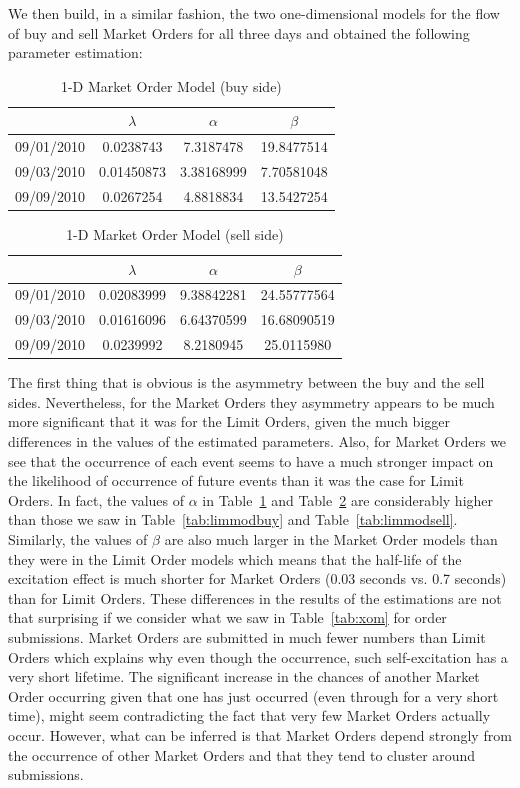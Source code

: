 We then build, in a similar fashion, the two one-dimensional models for the flow of buy and sell Market Orders for all three days and obtained the following parameter estimation: 
	\begin{table}[!ht]
	\centering
	\caption{1-D Market Order Model (buy side) \label{tab:marketorderbuy}}
	\begin{tabular}{c|ccc} 
		& $\lambda$ & $\alpha$ & $\beta$ \\ \hline
	09/01/2010 & 0.0238743 & 7.3187478 & 19.8477514 \\
	09/03/2010 & 0.01450873 & 3.38168999 & 7.70581048 \\
	09/09/2010 & 0.0267254 & 4.8818834 & 13.5427254
	\end{tabular}
	\end{table}
	\begin{table}[!ht]
	\centering
	\caption{1-D Market Order Model (sell side) \label{fig:marketordersell}}
	\begin{tabular}{c|ccc} 
		& $\lambda$ & $\alpha$  & $\beta$ \\ \hline
	09/01/2010 & 0.02083999 & 9.38842281 & 24.55777564 \\
	09/03/2010 & 0.01616096 & 6.64370599 & 16.68090519 \\
	09/09/2010 & 0.0239992 & 8.2180945 & 25.0115980
	\end{tabular}
	\end{table}
The first thing that is obvious is the asymmetry between the buy and the sell sides. Nevertheless, for the Market Orders they asymmetry appears to be much more significant that it was for the Limit Orders, given the much bigger differences in the values of the estimated parameters. Also, for Market Orders we see that the occurrence of each event seems to have a much stronger impact on the likelihood of occurrence of future events than it was the case for Limit Orders. In fact, the values of $\alpha$ in Table~\ref{tab:marketorderbuy} and Table~\ref{fig:marketordersell} are considerably higher than those we saw in Table~\ref{tab:limmodbuy} and Table~\ref{tab:limmodsell}. Similarly, the values of $\beta$ are also much larger in the Market Order models than they were in the Limit Order models which means that the half-life of the excitation effect is much shorter for Market Orders (0.03 seconds vs. 0.7 seconds) than for Limit Orders. These differences in the results of the estimations are not that surprising if we consider what we saw in Table~\ref{tab:xom} for order submissions. Market Orders are submitted in much fewer numbers than Limit Orders which explains why even though the occurrence, such self-excitation has a very short lifetime. The significant increase in the chances of another Market Order occurring given that one has just occurred (even through for a very short time), might seem contradicting the fact that very few Market Orders actually occur. However, what can be inferred is that Market Orders depend strongly from the occurrence of other Market Orders and that they tend to cluster around submissions. 


